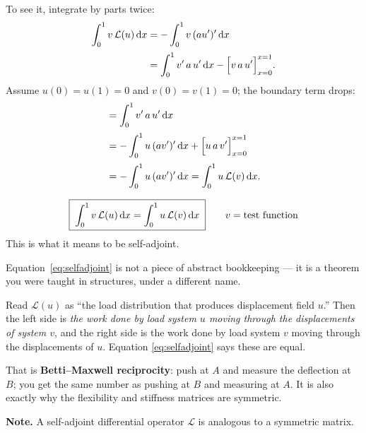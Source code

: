 To see it, integrate by parts twice:
\begin{align}
  \int_{0}^{1} v\,\mathcal{L}(u)\,\mathrm{d} x
    &= -\int_{0}^{1} v\,(au')'\,\mathrm{d} x \notag\\[2pt]
    &= \int_{0}^{1} v'\,a\,u'\,\mathrm{d} x - \Bigl[v\,a\,u'\Bigr]_{x=0}^{x=1}.
    \label{eq:sa1}
\end{align}
Assume $u(0)=u(1)=0$ and $v(0)=v(1)=0$; the boundary term drops:
\begin{align}
  &= \int_{0}^{1} v'\,a\,u'\,\mathrm{d} x \notag\\[2pt]
  &= -\int_{0}^{1} u\,(a v')'\,\mathrm{d} x + \Bigl[u\,a\,v'\Bigr]_{x=0}^{x=1} \notag\\[2pt]
  &= -\int_{0}^{1} u\,(a v')'\,\mathrm{d} x
   = \int_{0}^{1} u\,\mathcal{L}(v)\,\mathrm{d} x .
\end{align}

\begin{equation}\label{eq:selfadjoint}
  \boxed{\;\int_{0}^{1} v\,\mathcal{L}(u)\,\mathrm{d} x = \int_{0}^{1} u\,\mathcal{L}(v)\,\mathrm{d} x\;}
  \qquad v = \text{test function}
\end{equation}
This is what it means to be self-adjoint.


\begin{intuition}
Equation~\eqref{eq:selfadjoint} is not a piece of abstract bookkeeping --- it is
a theorem you were taught in structures, under a different name.

Read $\mathcal{L}(u)$ as ``the load distribution that produces displacement
field $u$.'' Then the left side is \emph{the work done by load system $u$ moving
through the displacements of system $v$}, and the right side is the work done by
load system $v$ moving through the displacements of $u$. Equation
\eqref{eq:selfadjoint} says these are equal.

That is \textbf{Betti--Maxwell reciprocity}: push at $A$ and measure the
deflection at $B$; you get the same number as pushing at $B$ and measuring at
$A$. It is also exactly why the flexibility and stiffness matrices are
symmetric.
\end{intuition}

\medskip
\noindent
\textbf{Note.} A self-adjoint differential operator $\mathcal{L}$ is analogous
to a symmetric matrix.


